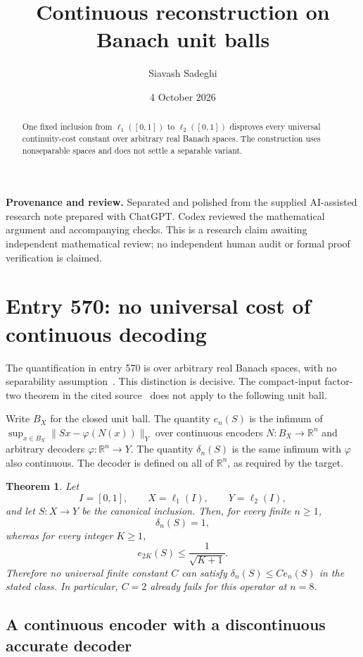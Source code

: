 \documentclass[11pt,a4paper]{article}
\newtheorem{theorem}{Theorem}[section]
\theoremstyle{remark}
\newcommand{\R}{\mathbb R}
\begin{document}
\title{Continuous reconstruction on Banach unit balls}
\author{Siavash Sadeghi}
\date{4 October 2026}
\maketitle
\begin{abstract}
One fixed inclusion from $\ell_1([0,1])$ to $\ell_2([0,1])$ disproves every universal continuity-cost constant over arbitrary real Banach spaces. The construction uses nonseparable spaces and does not settle a separable variant.
\end{abstract}
\textbf{Provenance and review.} Separated and polished from the supplied AI-assisted research note prepared with ChatGPT. Codex reviewed the mathematical argument and accompanying checks. This is a research claim awaiting independent mathematical review; no independent human audit or formal proof verification is claimed.
\medskip
\section{Entry 570: no universal cost of continuous decoding}\label{sec:decoder}

The quantification in entry 570 is over arbitrary real Banach spaces, with no separability assumption~\cite{repo570}. This distinction is decisive. The compact-input factor-two theorem in the cited source~\cite{knu} does not apply to the following unit ball.

Write $B_X$ for the closed unit ball. The quantity $e_n(S)$ is the infimum of
$\sup_{x\in B_X}\|Sx-\varphi(N(x))\|_Y$ over continuous encoders
$N:B_X\to\R^n$ and arbitrary decoders $\varphi:\R^n\to Y$.
The quantity $\delta_n(S)$ is the same infimum with $\varphi$ also continuous.
The decoder is defined on all of $\R^n$, as required by the target.

\begin{theorem}\label{thm:decoder}
Let
\[
 I=[0,1],\qquad X=\ell_1(I),\qquad Y=\ell_2(I),
\]
and let $S:X\to Y$ be the canonical inclusion. Then, for every finite $n\ge1$,
\[
 \delta_n(S)=1,
\]
whereas for every integer $K\ge1$,
\[
 e_{2K}(S)\le\frac1{\sqrt{K+1}}.
\]
Therefore no universal finite constant $C$ can satisfy $\delta_n(S)\le Ce_n(S)$ in the stated class. In particular, $C=2$ already fails for this operator at $n=8$.
\end{theorem}

\subsection{A continuous encoder with a discontinuous accurate decoder}
\end{document}
